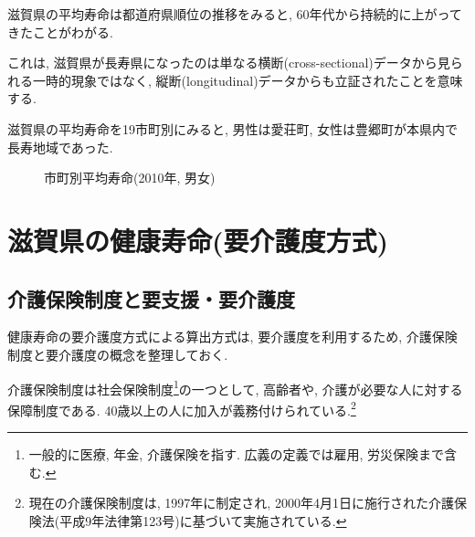 滋賀県の平均寿命は都道府県順位の推移をみると,
60年代から持続的に上がってきたことがわがる.

これは, 滋賀県が長寿県になったのは単なる横断(cross-sectional)データから見られる一時的現象ではなく, 縦断(longitudinal)データからも立証されたことを意味する.

滋賀県の平均寿命を19市町別にみると, 男性は愛荘町, 女性は豊郷町が本県内で長寿地域であった.
\begin{figure}[h!]
	\begin{center}
		\caption{市町別平均寿命(2010年, 男女)}\label{fig1}
	\end{center}
\end{figure}


\section{滋賀県の健康寿命(要介護度方式)}
\subsection{介護保険制度と要支援・要介護度}
健康寿命の要介護度方式による算出方式は, 要介護度を利用するため, 介護保険制度と要介護度の概念を整理しておく.

介護保険制度は社会保険制度\footnote{一般的に医療, 年金, 介護保険を指す. 広義の定義では雇用, 労災保険まで含む.
}の一つとして,
高齢者や, 介護が必要な人に対する保障制度である.
40歳以上の人に加入が義務付けられている.\footnote{
	現在の介護保険制度は, 1997年に制定され, 2000年4月1日に施行された介護保険法(平成9年法律第123号)に基づいて実施されている.
}



